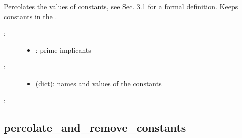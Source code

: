 \documentclass[letterpaper,10pt,english]{sphinxmanual}
\begin{document}
\begin{fulllineitems}
\label{\detokenize{PrimeImplicants:PyBoolNet.PrimeImplicants.percolate_and_keep_constants}}
Percolates the values of constants, see {\hyperref[\detokenize{Bibliography:klarner2015approx}]{}} Sec. 3.1 for a formal definition.
Keeps constants in the .
\begin{description}
\item[{:}] \leavevmode\begin{itemize}
\item {} 
: prime implicants

\end{itemize}

\item[{:}] \leavevmode\begin{itemize}
\item {} 
 (dict): names and values of the constants

\end{itemize}

\end{description}

:

\begin{sphinxVerbatim}[commandchars=\\\{\}]
  
\end{sphinxVerbatim}

\end{fulllineitems}



\subsection{percolate\_and\_remove\_constants}
\label{\detokenize{PrimeImplicants:percolate-and-remove-constants}}\label{\detokenize{PrimeImplicants:id17}}
\end{document}
